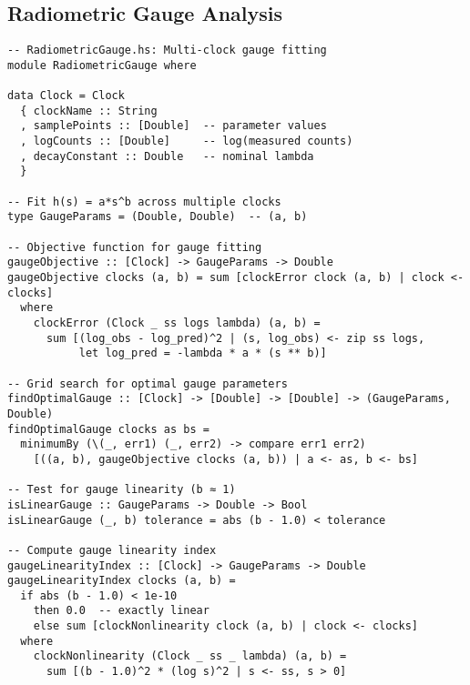 \documentclass[11pt]{article}
\theoremstyle{definition}
\theoremstyle{plain}
\theoremstyle{remark}
\begin{document}
\subsection*{Radiometric Gauge Analysis}
\begin{lstlisting}
-- RadiometricGauge.hs: Multi-clock gauge fitting
module RadiometricGauge where

data Clock = Clock 
  { clockName :: String
  , samplePoints :: [Double]  -- parameter values
  , logCounts :: [Double]     -- log(measured counts)
  , decayConstant :: Double   -- nominal lambda
  }

-- Fit h(s) = a*s^b across multiple clocks
type GaugeParams = (Double, Double)  -- (a, b)

-- Objective function for gauge fitting
gaugeObjective :: [Clock] -> GaugeParams -> Double  
gaugeObjective clocks (a, b) = sum [clockError clock (a, b) | clock <- clocks]
  where
    clockError (Clock _ ss logs lambda) (a, b) = 
      sum [(log_obs - log_pred)^2 | (s, log_obs) <- zip ss logs,
           let log_pred = -lambda * a * (s ** b)]

-- Grid search for optimal gauge parameters
findOptimalGauge :: [Clock] -> [Double] -> [Double] -> (GaugeParams, Double)
findOptimalGauge clocks as bs = 
  minimumBy (\(_, err1) (_, err2) -> compare err1 err2)
    [((a, b), gaugeObjective clocks (a, b)) | a <- as, b <- bs]

-- Test for gauge linearity (b ≈ 1)
isLinearGauge :: GaugeParams -> Double -> Bool
isLinearGauge (_, b) tolerance = abs (b - 1.0) < tolerance

-- Compute gauge linearity index
gaugeLinearityIndex :: [Clock] -> GaugeParams -> Double
gaugeLinearityIndex clocks (a, b) = 
  if abs (b - 1.0) < 1e-10 
    then 0.0  -- exactly linear
    else sum [clockNonlinearity clock (a, b) | clock <- clocks]
  where
    clockNonlinearity (Clock _ ss _ lambda) (a, b) =
      sum [(b - 1.0)^2 * (log s)^2 | s <- ss, s > 0]
\end{lstlisting}
\end{document}
